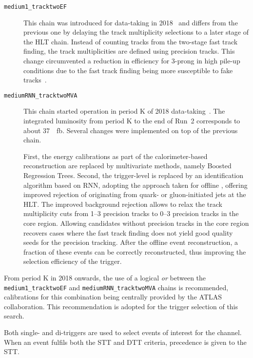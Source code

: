 \begin{description}
\item[\texttt{medium1\_tracktwoEF}]
  This chain was introduced for data-taking in
  2018~\cite{ATL-DAQ-PUB-2019-001} and differs from the previous one
  by delaying the track multiplicity selections to a later stage of
  the HLT chain. Instead of counting tracks from the two-stage fast
  track finding, the track multiplicities are defined using precision
  tracks. This change circumvented a reduction in efficiency for
  3-prong \tauhadvis in high pile-up conditions due to the fast track
  finding being more susceptible to fake
  tracks~\cite{ATL-DAQ-PUB-2019-001}.

\item[\texttt{mediumRNN\_tracktwoMVA}] This chain started operation in
  period K of 2018 data-taking~\cite{ATL-DAQ-PUB-2019-001}. The
  integrated luminosity from period K to the end of Run~2 corresponds
  to about \SI{37}{\per\femto\barn}. Several changes were implemented
  on top of the previous chain.

  First, the \tauhadvis energy calibrations as part of the
  calorimeter-based \tauhadvis reconstruction are replaced by
  multivariate methods, namely Boosted Regression Trees. Second, the
  trigger-level \tauid is replaced by an identification algorithm
  based on RNN, adopting the approach taken for offline \tauid,
  offering improved rejection of \tauhadvis originating from quark- or
  gluon-initiated jets at the HLT. The improved background rejection
  allows to relax the track multiplicity cuts from 1--3 precision
  tracks to 0--3 precision tracks in the core region. Allowing
  \tauhadvis candidates without precision tracks in the core region
  recovers cases where the fast track finding does not yield good
  quality seeds for the precision tracking.  After the offline event
  reconstruction, a fraction of these events can be correctly
  reconstructed, thus improving the selection efficiency of the
  trigger.
\end{description}
From period K in 2018 onwards, the use of a logical \emph{or} between
the \texttt{medium1\_tracktwoEF} and \texttt{mediumRNN\_tracktwoMVA}
chains is recommended, calibrations for this combination being
centrally provided by the ATLAS collaboration. This recommendation is
adopted for the trigger selection of this search.

Both single- and di-\tauhadvis triggers are used to select events of
interest for the \hadhad channel. When an event fulfils both the STT
and DTT criteria, precedence is given to the STT.

